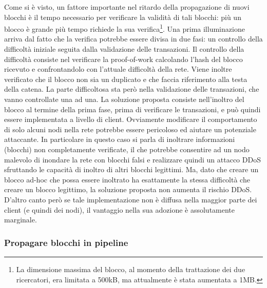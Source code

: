 Come si è visto, un fattore importante nel ritardo della propagazione di nuovi blocchi è il tempo necessario per verificare la validità di tali blocchi: più un blocco è grande più tempo richiede la sua verifica\footnote{La dimensione massima del blocco, al momento della trattazione dei due ricercatori, era limitata a 500kB, ma attualmente è stata aumentata a 1MB.}.
Una prima illuminazione arriva dal fatto che la verifica potrebbe essere divisa in due fasi: un controllo della difficoltà iniziale seguita dalla validazione delle transazioni.
Il controllo della difficoltà consiste nel verificare la proof-of-work calcolando l'hash del blocco ricevuto e confrontandolo con l'attuale difficoltà della rete. Viene inoltre verificato che il blocco non sia un duplicato e che faccia riferimento alla testa della catena.
La parte difficoltosa sta però nella validazione delle transazioni, che vanno controllate una ad una.
La soluzione proposta consiste nell'inoltro del blocco al termine della prima fase, prima di verificare le transazioni, e può quindi essere implementata a livello di client. Ovviamente modificare il comportamento di solo alcuni nodi nella rete potrebbe essere pericoloso ed aiutare un potenziale attaccante. In particolare in questo caso si parla di inoltrare informazioni (blocchi) non completamente verificate, il che potrebbe consentire ad un nodo malevolo di inondare la rete con blocchi falsi e realizzare quindi un attacco DDoS sfruttando le capacità di inoltro di altri blocchi legittimi.
Ma, dato che creare un blocco ad-hoc che possa essere inoltrato ha esattamente la stessa difficoltà che creare un blocco legittimo, la soluzione proposta non aumenta il rischio DDoS.
D'altro canto però se tale implementazione non è diffusa nella maggior parte dei client (e quindi dei nodi), il vantaggio nella sua adozione è assolutamente marginale.

\subsubsection{Propagare blocchi in pipeline}

